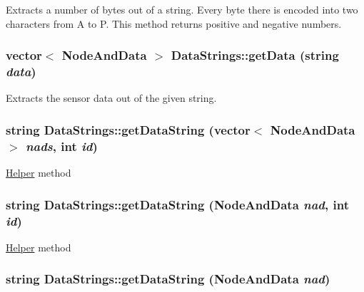 \label{classDataStrings_a966c13fc690343dbe1022efaa0d64361}
Extracts a number of bytes out of a string. Every byte there is encoded into two characters from A to P. This method returns positive and negative numbers. \hypertarget{classDataStrings_ad9df1b24bed654e0b7da9e354e5a4e43}{
\subsubsection[{getData}]{\setlength{\rightskip}{0pt plus 5cm}vector$<$ {\bf NodeAndData} $>$ DataStrings::getData (string {\em data})}}
\label{classDataStrings_ad9df1b24bed654e0b7da9e354e5a4e43}
Extracts the sensor data out of the given string. \hypertarget{classDataStrings_a58aaa4afbc8154c8e68da0572b1c3da1}{
\subsubsection[{getDataString}]{\setlength{\rightskip}{0pt plus 5cm}string DataStrings::getDataString (vector$<$ {\bf NodeAndData} $>$ {\em nads}, \/  int {\em id})}}
\label{classDataStrings_a58aaa4afbc8154c8e68da0572b1c3da1}
\hyperlink{classHelper}{Helper} method \hypertarget{classDataStrings_ae4666d61ff8ee1bd2630041a0c812436}{
\subsubsection[{getDataString}]{\setlength{\rightskip}{0pt plus 5cm}string DataStrings::getDataString ({\bf NodeAndData} {\em nad}, \/  int {\em id})}}
\label{classDataStrings_ae4666d61ff8ee1bd2630041a0c812436}
\hyperlink{classHelper}{Helper} method \hypertarget{classDataStrings_ae3279bea5f297a4244c726231489397d}{
\subsubsection[{getDataString}]{\setlength{\rightskip}{0pt plus 5cm}string DataStrings::getDataString ({\bf NodeAndData} {\em nad})}}
